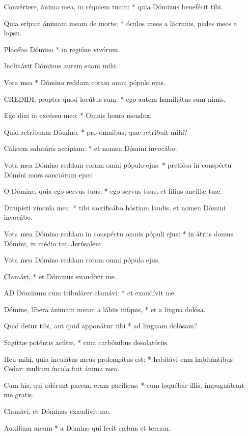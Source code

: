 Convértere, ánima mea, in réquiem tuam: * quia Dóminus benefécit tibi.

Quia erípuit ánimam meam de morte: * óculos meos a lácrimis, pedes meos a lapsu.

Placébo Dómino * in regióne vivórum.

 Inclinávit Dóminus aurem suam mihi.

 Vota mea * Dómino reddam coram omni pópulo ejus.


\lettrine[lines=2]{C}{REDIDI}, propter quod locútus sum: * ego autem humiliátus sum nimis.

Ego dixi in excéssu meo: * Omnis homo mendax.

Quid retríbuam Dómino, * pro ómnibus, quæ retríbuit mihi?

Cálicem salutáris accípiam: * et nomen Dómini invocábo.

Vota mea Dómino reddam coram omni pópulo ejus: * pretiósa in conspéctu Dómini mors sanctórum ejus:

O Dómine, quia ego servus tuus: * ego servus tuus, et fílius ancíllæ tuæ.

Dirupísti víncula mea: * tibi sacrificábo hóstiam laudis, et nomen Dómini invocábo.

Vota mea Dómino reddam in conspéctu omnis pópuli ejus: * in átriis domus Dómini, in médio tui, Jerúsalem.

 Vota mea Dómino reddam coram omni pópulo ejus.

 Clamávi, * et Dóminus exaudívit me.


\lettrine[lines=2]{A}{D} Dóminum cum tribulárer clamávi: * et exaudívit me.

Dómine, líbera ánimam meam a lábiis iníquis, * et a lingua dolósa.

Quid detur tibi, aut quid apponátur tibi * ad linguam dolósam?

Sagíttæ poténtis acútæ, * cum carbónibus desolatóriis.

Heu mihi, quia incolátus meus prolongátus est: * habitávi cum habitántibus Cedar: multum íncola fuit ánima mea.

Cum his, qui odérunt pacem, eram pacíficus: * cum loquébar illis, impugnábant me gratis.

 Clamávi, et Dóminus exaudívit me.

 Auxílium meum * a Dómino qui fecit cælum et terram.

